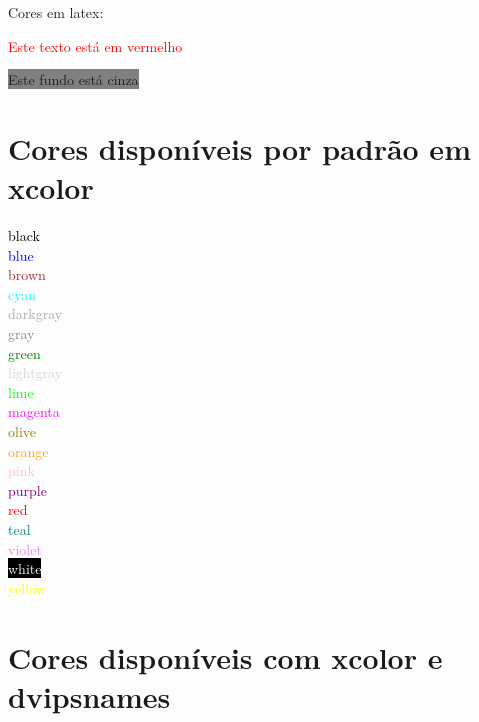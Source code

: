 \documentclass[12pt]{article}
\begin{document}
	Cores em latex:
	
	\textcolor{red}{Este texto está em vermelho}
	
	\colorbox{gray}{Este fundo está cinza}
	
	\section{Cores disponíveis por padrão em xcolor}
	
	\textcolor{black}{black}\\
	\textcolor{blue}{blue}\\
	\textcolor{brown}{brown}\\
	\textcolor{cyan}{cyan}\\
	\textcolor{darkgray}{darkgray}\\
	\textcolor{gray}{gray}\\
	\textcolor{green}{green}\\
	\textcolor{lightgray}{lightgray}\\
	\textcolor{lime}{lime}\\
	\textcolor{magenta}{magenta}\\
	\textcolor{olive}{olive}\\
	\textcolor{orange}{orange}\\
	\textcolor{pink}{pink}\\
	\textcolor{purple}{purple}\\
	\textcolor{red}{red}\\
	\textcolor{teal}{teal}\\
	\textcolor{violet}{violet}\\
	\colorbox{black}{\textcolor{white}{white}}\\
	\textcolor{yellow}{yellow}
	
	\newpage
	\section{Cores disponíveis com xcolor e dvipsnames}
	
\end{document}
